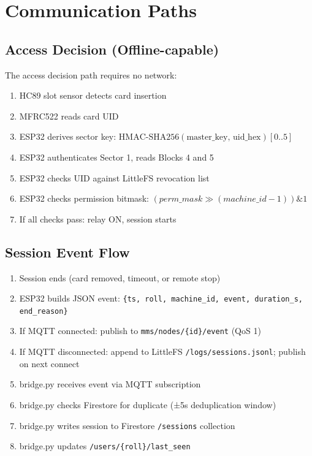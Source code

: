 \section{Communication Paths}

\subsection{Access Decision (Offline-capable)}

The access decision path requires no network:
\begin{enumerate}[leftmargin=1.5em]
    \item HC89 slot sensor detects card insertion
    \item MFRC522 reads card UID
    \item ESP32 derives sector key: $\text{HMAC-SHA256}(\text{master\_key},\, \text{uid\_hex})[0..5]$
    \item ESP32 authenticates Sector 1, reads Blocks 4 and 5
    \item ESP32 checks UID against LittleFS revocation list
    \item ESP32 checks permission bitmask: $(perm\_mask \gg (machine\_id - 1)) \& 1$
    \item If all checks pass: relay ON, session starts
\end{enumerate}

\subsection{Session Event Flow}

\begin{enumerate}[leftmargin=1.5em]
    \item Session ends (card removed, timeout, or remote stop)
    \item ESP32 builds JSON event: \texttt{\{ts, roll, machine\_id, event, duration\_s, end\_reason\}}
    \item If MQTT connected: publish to \texttt{mms/nodes/\{id\}/event} (QoS 1)
    \item If MQTT disconnected: append to LittleFS \texttt{/logs/sessions.jsonl}; publish on next connect
    \item bridge.py receives event via MQTT subscription
    \item bridge.py checks Firestore for duplicate (±5s deduplication window)
    \item bridge.py writes session to Firestore \texttt{/sessions} collection
    \item bridge.py updates \texttt{/users/\{roll\}/last\_seen}
\end{enumerate}


